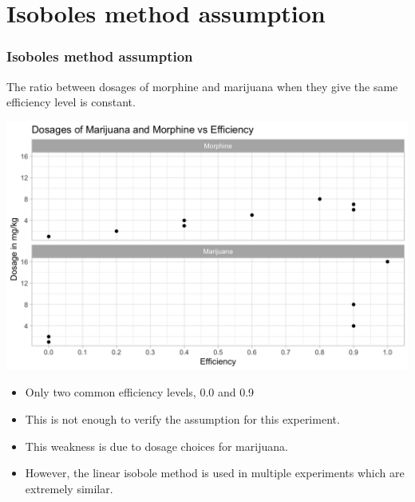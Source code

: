 \documentclass[14pt]{beamer}
\begin{document}
\section{Isoboles method assumption}
\begin{frame}
\frametitle{Isoboles method assumption}
The ratio between dosages of morphine and marijuana when they give the same efficiency level is constant.
\end{frame}

\begin{frame}
\includegraphics[scale=0.22]{dos_vs_eff.png}
\end{frame}

\begin{frame}
\begin{itemize}[label={$\blacktriangleright$}]
\item Only two common efficiency levels, 0.0 and 0.9
\item This is not enough to verify the assumption for this experiment.
\item This weakness is due to dosage choices for marijuana.
\item However, the linear isobole method is used in multiple experiments which are extremely similar.
\end{itemize}
\end{frame}
\end{document}
